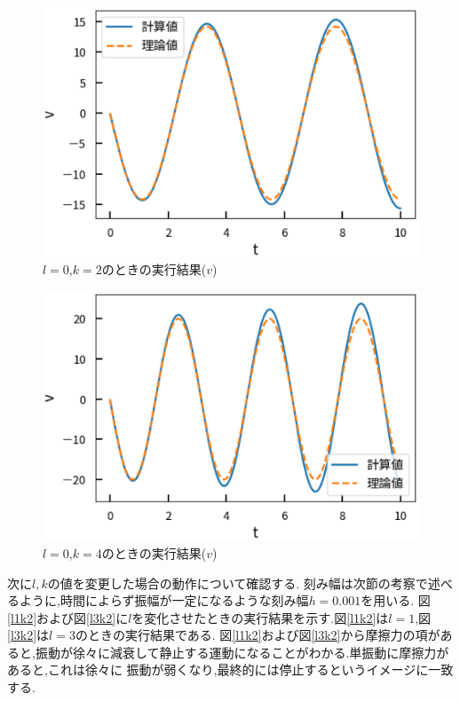 \documentclass[a4j]{jarticle}
\begin{document}
      \begin{figure}[H]
      \centering
      \includegraphics[scale=0.6]{l0k2v.eps}
      \caption{$l=0$,$k=2$のときの実行結果($v$)}
      \label{l0k2m1v}
      \end{figure}

      \begin{figure}[H]
        \centering
        \includegraphics[scale=0.6]{l0k4v.eps}
        \caption{$l=0$,$k=4$のときの実行結果($v$)}
        \label{l0k4m1v}
        \end{figure}
    

        次に$l,k$の値を変更した場合の動作について確認する. 刻み幅は次節の考察で述べるように,時間によらず振幅が一定になるような刻み幅$h=0.001$を用いる.
        図\ref{l1k2}および図\ref{l3k2}に$l$を変化させたときの実行結果を示す.図\ref{l1k2}は$l=1$,図\ref{l3k2}は$l=3$のときの実行結果である.
        図\ref{l1k2}および図\ref{l3k2}から摩擦力の項があると,振動が徐々に減衰して静止する運動になることがわかる.単振動に摩擦力があると,これは徐々に
        振動が弱くなり,最終的には停止するというイメージに一致する.
        
\end{document}
